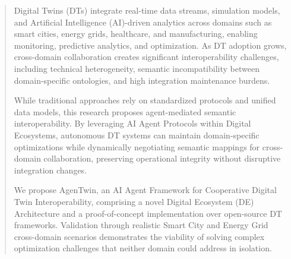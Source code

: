 
\begin{abstract}

Digital Twins (DTs) integrate real-time data streams, simulation models, and Artificial Intelligence (AI)-driven analytics across domains such as
    smart cities,
    energy grids,
    healthcare, and
    manufacturing, 
    enabling monitoring, predictive analytics, and optimization.
As DT adoption grows, cross-domain collaboration creates significant interoperability challenges, including
    technical heterogeneity,
    semantic incompatibility between domain-specific ontologies, and
    high integration maintenance burdens.

While traditional approaches rely on standardized protocols and unified data models,
    this research proposes agent-mediated semantic interoperability.
By leveraging AI Agent Protocols within Digital Ecosystems,
    autonomous DT systems can maintain domain-specific optimizations
    while dynamically negotiating semantic mappings for cross-domain collaboration,
    preserving operational integrity without disruptive integration changes.

We propose AgenTwin, an AI Agent Framework for Cooperative Digital Twin Interoperability, comprising
    a novel Digital Ecosystem (DE) Architecture and
    a proof-of-concept implementation over open-source DT frameworks.
Validation through realistic Smart City and Energy Grid cross-domain scenarios demonstrates
    the viability of solving complex optimization challenges that neither domain could address in isolation.
\end{abstract}


